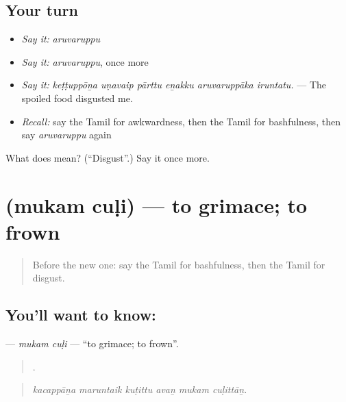 \subsection*{Your turn}
\begin{itemize}
\raggedright
  \item \emph{Say it:} \emph{aruvaruppu}
  \item \emph{Say it:} \emph{aruvaruppu}, once more
  \item \emph{Say it:} \emph{keṭṭuppōṉa uṇavaip pārttu eṉakku aruvaruppāka iruntatu.} — The spoiled food disgusted me.
  \item \emph{Recall:} say the Tamil for awkwardness, then the Tamil for bashfulness, then say \emph{aruvaruppu} again
\end{itemize}

\begin{tcolorbox}[breakable,colback=teal!4,colframe=teal!35!black,title={Before you move on}]
What does  mean? (\textquotedblleft{}Disgust\textquotedblright{}.) Say it once more.
\end{tcolorbox}
\section[\texorpdfstring{\ta{முகம்} \ta{சுளி} (mukam cuḷi)}{முகம் சுளி (mukam cuḷi)}]{  (mukam cuḷi) — to grimace; to frown}

\label{lesson:TA-C462-mukam-culi}



\begin{quote}
Before the new one: say the Tamil for bashfulness, then the Tamil for disgust.
\end{quote}

\subsection*{You'll want to know:  }
\textbf{ } — \emph{mukam cuḷi} — \textquotedblleft{}to grimace; to frown\textquotedblright{}.

\begin{quote}
     .
\end{quote}

\begin{quote}
\emph{kacappāṉa maruntaik kuṭittu avaṉ mukam cuḷittāṉ.}
\end{quote}

